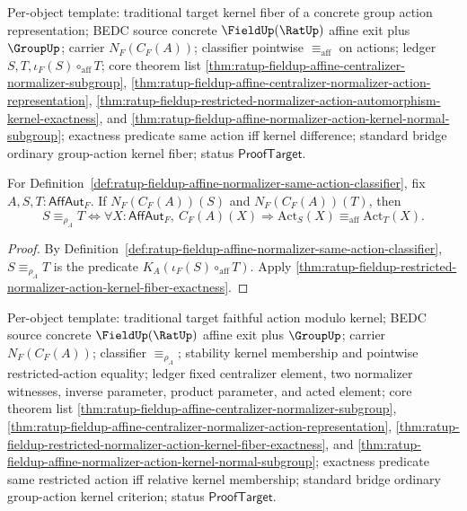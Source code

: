 Per-object template: traditional target kernel fiber of a concrete group action
representation; BEDC source concrete $\FieldUp(\RatUp)$ affine exit plus
$\GroupUp$; carrier $N_F(C_F(A))$; classifier pointwise
$\equiv_{\mathrm{aff}}$ on actions; ledger $S,T,\iota_F(S)\circ_{\mathrm{aff}}T$;
core theorem list
\autoref{thm:ratup-fieldup-affine-centralizer-normalizer-subgroup},
\autoref{thm:ratup-fieldup-affine-centralizer-normalizer-action-representation},
\autoref{thm:ratup-fieldup-restricted-normalizer-action-automorphism-kernel-exactness},
and
\autoref{thm:ratup-fieldup-affine-normalizer-action-kernel-normal-subgroup};
exactness predicate same action iff kernel difference; standard bridge ordinary
group-action kernel fiber; status $\mathsf{ProofTarget}$.

\begin{theorem}
\label{thm:ratup-fieldup-affine-normalizer-same-action-classifier-determinacy}
For Definition~\ref{def:ratup-fieldup-affine-normalizer-same-action-classifier},
fix $A,S,T:\mathsf{AffAut}_F$. If $N_F(C_F(A))(S)$ and $N_F(C_F(A))(T)$, then
$$
S\equiv_{\rho_A}T
\Longleftrightarrow
\forall X:\mathsf{AffAut}_F,\ C_F(A)(X)\Rightarrow
\mathrm{Act}_S(X)\equiv_{\mathrm{aff}}\mathrm{Act}_T(X).
$$
\end{theorem}
\begin{proof}
By Definition~\ref{def:ratup-fieldup-affine-normalizer-same-action-classifier},
$S\equiv_{\rho_A}T$ is the predicate
$K_A(\iota_F(S)\circ_{\mathrm{aff}}T)$. Apply
\autoref{thm:ratup-fieldup-restricted-normalizer-action-kernel-fiber-exactness}.
\end{proof}

Per-object template: traditional target faithful action modulo kernel; BEDC
source concrete $\FieldUp(\RatUp)$ affine exit plus $\GroupUp$; carrier
$N_F(C_F(A))$; classifier $\equiv_{\rho_A}$; stability kernel membership and
pointwise restricted-action equality; ledger fixed centralizer element, two
normalizer witnesses, inverse parameter, product parameter, and acted element;
core theorem list
\autoref{thm:ratup-fieldup-affine-centralizer-normalizer-subgroup},
\autoref{thm:ratup-fieldup-affine-centralizer-normalizer-action-representation},
\autoref{thm:ratup-fieldup-restricted-normalizer-action-kernel-fiber-exactness},
and
\autoref{thm:ratup-fieldup-affine-normalizer-action-kernel-normal-subgroup};
exactness predicate same restricted action iff relative kernel membership;
standard bridge ordinary group-action kernel criterion; status
$\mathsf{ProofTarget}$.

